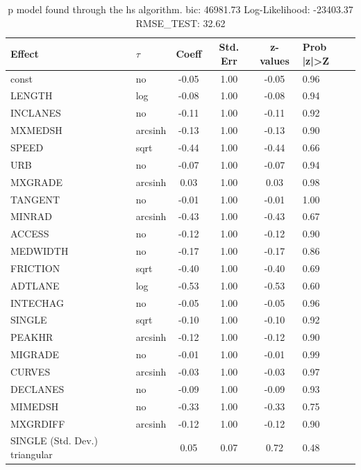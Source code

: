\begin{table}
	\caption{p model found through the hs algorithm. bic: 46981.73 Log-Likelihood: -23403.37 RMSE_TEST: 32.62}
	\begin{center}
		\begin{tabular}{|l|l|c|c|c|l|}
			\hline
			Effect & $\tau$ & Coeff & Std. Err & z-values & Prob |z|>Z \\
			\hline
			const & no & -0.05 & 1.00 & -0.05 & 0.96 \\
			\hline
			LENGTH & log & -0.08 & 1.00 & -0.08 & 0.94 \\
			\hline
			INCLANES & no & -0.11 & 1.00 & -0.11 & 0.92 \\
			\hline
			MXMEDSH & arcsinh & -0.13 & 1.00 & -0.13 & 0.90 \\
			\hline
			SPEED & sqrt & -0.44 & 1.00 & -0.44 & 0.66 \\
			\hline
			URB & no & -0.07 & 1.00 & -0.07 & 0.94 \\
			\hline
			MXGRADE & arcsinh & 0.03 & 1.00 & 0.03 & 0.98 \\
			\hline
			TANGENT & no & -0.01 & 1.00 & -0.01 & 1.00 \\
			\hline
			MINRAD & arcsinh & -0.43 & 1.00 & -0.43 & 0.67 \\
			\hline
			ACCESS & no & -0.12 & 1.00 & -0.12 & 0.90 \\
			\hline
			MEDWIDTH & no & -0.17 & 1.00 & -0.17 & 0.86 \\
			\hline
			FRICTION & sqrt & -0.40 & 1.00 & -0.40 & 0.69 \\
			\hline
			ADTLANE & log & -0.53 & 1.00 & -0.53 & 0.60 \\
			\hline
			INTECHAG & no & -0.05 & 1.00 & -0.05 & 0.96 \\
			\hline
			SINGLE & sqrt & -0.10 & 1.00 & -0.10 & 0.92 \\
			\hline
			PEAKHR & arcsinh & -0.12 & 1.00 & -0.12 & 0.90 \\
			\hline
			MIGRADE & no & -0.01 & 1.00 & -0.01 & 0.99 \\
			\hline
			CURVES & arcsinh & -0.03 & 1.00 & -0.03 & 0.97 \\
			\hline
			DECLANES & no & -0.09 & 1.00 & -0.09 & 0.93 \\
			\hline
			MIMEDSH & no & -0.33 & 1.00 & -0.33 & 0.75 \\
			\hline
			MXGRDIFF & arcsinh & -0.12 & 1.00 & -0.12 & 0.90 \\
			\hline
			SINGLE (Std. Dev.) triangular &  & 0.05 & 0.07 & 0.72 & 0.48 \\

\end{tabular}
\end{center}
\end{table}
